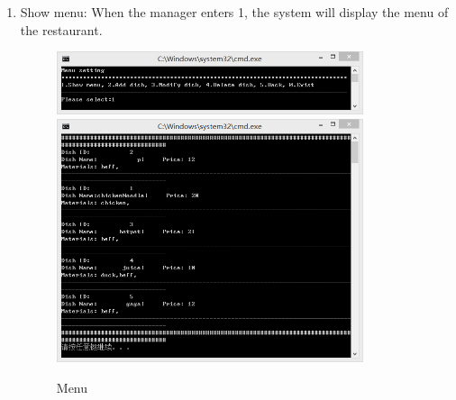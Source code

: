 \documentclass{article}
\begin{document}
\begin{enumerate}
    \item Show menu:\newline 
    When the manager enters 1, the system will display the menu of the restaurant.
        \begin{figure}[H]
        \centering
        \includegraphics[width=0.85\textwidth]{D/D1a.jpg}
        \includegraphics[width=0.85\textwidth]{D/D11111111.png}
        \caption{Menu}
        \end{figure}
    

\end{enumerate}
\end{document}
